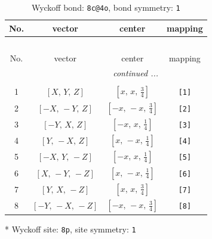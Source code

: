 \documentclass[fleqn,8pt]{jsarticle}
\begin{document}
\renewcommand{\arraystretch}{1.2}
\begin{longtable}{cccc}
\caption{Wyckoff bond: {\tt 8c@4o}, bond symmetry: {\tt 1}}
 \\
 \hline \hline
No. & vector & center & mapping \\ \hline \endfirsthead

\multicolumn{3}{l}{\tablename\ \thetable{}} \\
 \hline \hline
No. & vector & center & mapping \\ \hline \endhead

 \hline \hline
\multicolumn{3}{r}{\footnotesize\it continued ...} \\ \endfoot

 \hline \hline
\multicolumn{3}{r}{} \\ \endlastfoot

1 & $\left[ X,\, Y,\, Z \right]$ & $\left[ x,\, x,\, \frac{3}{4} \right]$ & {\tt [1]} \\ \hline
2 & $\left[ - X,\, - Y,\, Z \right]$ & $\left[ - x,\, - x,\, \frac{3}{4} \right]$ & {\tt [2]} \\ \hline
3 & $\left[ - Y,\, X,\, Z \right]$ & $\left[ - x,\, x,\, \frac{1}{4} \right]$ & {\tt [3]} \\ \hline
4 & $\left[ Y,\, - X,\, Z \right]$ & $\left[ x,\, - x,\, \frac{1}{4} \right]$ & {\tt [4]} \\ \hline
5 & $\left[ - X,\, Y,\, - Z \right]$ & $\left[ - x,\, x,\, \frac{1}{4} \right]$ & {\tt [5]} \\ \hline
6 & $\left[ X,\, - Y,\, - Z \right]$ & $\left[ x,\, - x,\, \frac{1}{4} \right]$ & {\tt [6]} \\ \hline
7 & $\left[ Y,\, X,\, - Z \right]$ & $\left[ x,\, x,\, \frac{3}{4} \right]$ & {\tt [7]} \\ \hline
8 & $\left[ - Y,\, - X,\, - Z \right]$ & $\left[ - x,\, - x,\, \frac{3}{4} \right]$ & {\tt [8]} \\
\end{longtable}
* Wyckoff site: {\tt 8p}, site symmetry: {\tt 1}
\renewcommand{\arraystretch}{1.2}
\end{document}
